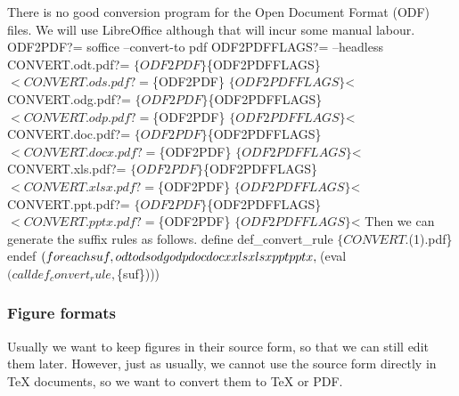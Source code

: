 There is no good conversion program for the Open Document Format (ODF) files.
We will use LibreOffice although that will incur some manual labour.
\nwenddocs{}\plusendmoddef\nwstartdeflinemarkup{}\nwenddeflinemarkup
ODF2PDF?=         soffice --convert-to pdf
ODF2PDFFLAGS?=    --headless
CONVERT.odt.pdf?= $\{ODF2PDF\} $\{ODF2PDFFLAGS\} $<
CONVERT.ods.pdf?= $\{ODF2PDF\} $\{ODF2PDFFLAGS\} $<
CONVERT.odg.pdf?= $\{ODF2PDF\} $\{ODF2PDFFLAGS\} $<
CONVERT.odp.pdf?= $\{ODF2PDF\} $\{ODF2PDFFLAGS\} $<
CONVERT.doc.pdf?= $\{ODF2PDF\} $\{ODF2PDFFLAGS\} $<
CONVERT.docx.pdf?=$\{ODF2PDF\} $\{ODF2PDFFLAGS\} $<
CONVERT.xls.pdf?= $\{ODF2PDF\} $\{ODF2PDFFLAGS\} $<
CONVERT.xlsx.pdf?=$\{ODF2PDF\} $\{ODF2PDFFLAGS\} $<
CONVERT.ppt.pdf?= $\{ODF2PDF\} $\{ODF2PDFFLAGS\} $<
CONVERT.pptx.pdf?=$\{ODF2PDF\} $\{ODF2PDFFLAGS\} $<
\nwendcode{}Then we can generate the suffix rules as follows.
\nwenddocs{}\endmoddef\nwstartdeflinemarkup{}\nwenddeflinemarkup
define def_convert_rule
  $\{CONVERT.$(1).pdf\}
endef
$(foreach suf,odt ods odg odp doc docx xls xlsx ppt pptx,\\
  $(eval $(call def_convert_rule,$\{suf\})))
\nwendcode{}\nwdocspar

\subsubsection{Figure formats}

Usually we want to keep figures in their source form, so that we can still edit
them later.
However, just as usually, we cannot use the source form directly in TeX 
documents, so we want to convert them to TeX or PDF.

